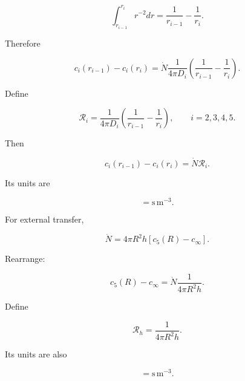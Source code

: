 \documentclass[11pt,a4paper]{article}
\begin{document}
\begin{equation}
\int_{r_{i-1}}^{r_i}r^{-2}dr
=
\frac1{r_{i-1}}-\frac1{r_i}.
\tag{TRISO-ML-382}
\label{eq:triso-ml-382}
\end{equation}

Therefore

\begin{equation}
c_i(r_{i-1})-c_i(r_i)
=
\dot N
\frac1{4\pi D_i}
\left(
\frac1{r_{i-1}}-\frac1{r_i}
\right).
\tag{TRISO-ML-383}
\label{eq:triso-ml-383}
\end{equation}

Define

\begin{equation}
\boxed{
\mathcal R_i
=
\frac1{4\pi D_i}
\left(
\frac1{r_{i-1}}-\frac1{r_i}
\right),
\qquad i=2,3,4,5.
}
\tag{TRISO-ML-384}
\label{eq:triso-ml-384}
\end{equation}

Then

\begin{equation}
c_i(r_{i-1})-c_i(r_i)=\dot N\mathcal R_i.
\tag{TRISO-ML-385}
\label{eq:triso-ml-385}
\end{equation}

Its units are

\begin{equation}
[\mathcal R_i]
=
\mathrm{s\,m^{-3}}.
\tag{TRISO-ML-386}
\label{eq:triso-ml-386}
\end{equation}

For external transfer,

\begin{equation}
\dot N
=
4\pi R^2h[c_5(R)-c_\infty].
\tag{TRISO-ML-387}
\label{eq:triso-ml-387}
\end{equation}

Rearrange:

\begin{equation}
c_5(R)-c_\infty
=
\dot N
\frac1{4\pi R^2h}.
\tag{TRISO-ML-388}
\label{eq:triso-ml-388}
\end{equation}

Define

\begin{equation}
\boxed{
\mathcal R_h
=
\frac1{4\pi R^2h}.
}
\tag{TRISO-ML-389}
\label{eq:triso-ml-389}
\end{equation}

Its units are also

\begin{equation}
[\mathcal R_h]=\mathrm{s\,m^{-3}}.
\tag{TRISO-ML-390}
\label{eq:triso-ml-390}
\end{equation}
\end{document}
